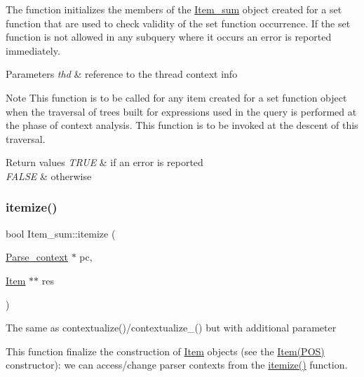 The function initializes the members of the \mbox{\hyperlink{classItem__sum}{Item\+\_\+sum}} object created for a set function that are used to check validity of the set function occurrence. If the set function is not allowed in any subquery where it occurs an error is reported immediately.


\begin{DoxyParams}{Parameters}
{\em thd} & reference to the thread context info\\
\hline
\end{DoxyParams}
\begin{DoxyNote}{Note}
This function is to be called for any item created for a set function object when the traversal of trees built for expressions used in the query is performed at the phase of context analysis. This function is to be invoked at the descent of this traversal. 
\end{DoxyNote}

\begin{DoxyRetVals}{Return values}
{\em T\+R\+UE} & if an error is reported \\
\hline
{\em F\+A\+L\+SE} & otherwise \\
\hline
\end{DoxyRetVals}
\mbox{\label{classItem__sum_ab44941149d918895e5f58ae94d3cd909}} 
\subsubsection{\texorpdfstring{itemize()}{itemize()}}
{\footnotesize\ttfamily bool Item\+\_\+sum\+::itemize (\begin{DoxyParamCaption}\item[{\mbox{\hyperlink{structParse__context}{Parse\+\_\+context}} $\ast$}]{pc,  }\item[{\mbox{\hyperlink{classItem}{Item}} $\ast$$\ast$}]{res }\end{DoxyParamCaption})\hspace{0.3cm}{\ttfamily [virtual]}}

The same as contextualize()/contextualize\+\_\+() but with additional parameter

This function finalize the construction of \mbox{\hyperlink{classItem}{Item}} objects (see the \mbox{\hyperlink{classItem}{Item(\+P\+O\+S)}} constructor)\+: we can access/change parser contexts from the \mbox{\hyperlink{classItem__sum_ab44941149d918895e5f58ae94d3cd909}{itemize()}} function.


